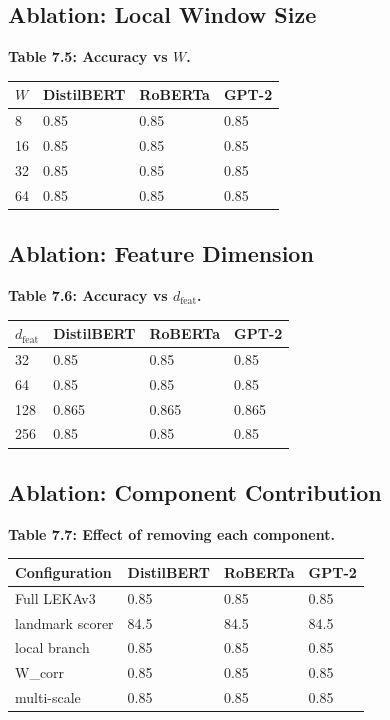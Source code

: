 \subsection{Ablation: Local Window Size}

\textbf{Table 7.5: Accuracy vs $W$.}

\begin{table}[H]
\centering
\small
\begin{tabular}{llll}
\toprule
\textbf{$W$} & \textbf{DistilBERT} & \textbf{RoBERTa} & \textbf{GPT-2} \\
\midrule
8 & 0.85 & 0.85 & 0.85 \\
16 & 0.85 & 0.85 & 0.85 \\
32 & 0.85 & 0.85 & 0.85 \\
64 & 0.85 & 0.85 & 0.85 \\
\bottomrule
\end{tabular}
\end{table}

\subsection{Ablation: Feature Dimension}

\textbf{Table 7.6: Accuracy vs $d_\text{feat}$.}

\begin{table}[H]
\centering
\small
\begin{tabular}{llll}
\toprule
\textbf{$d_\text{feat}$} & \textbf{DistilBERT} & \textbf{RoBERTa} & \textbf{GPT-2} \\
\midrule
32 & 0.85 & 0.85 & 0.85 \\
64 & 0.85 & 0.85 & 0.85 \\
128 & 0.865 & 0.865 & 0.865 \\
256 & 0.85 & 0.85 & 0.85 \\
\bottomrule
\end{tabular}
\end{table}

\subsection{Ablation: Component Contribution}

\textbf{Table 7.7: Effect of removing each component.}

\begin{table}[H]
\centering
\small
\begin{tabular}{llll}
\toprule
\textbf{Configuration} & \textbf{DistilBERT} & \textbf{RoBERTa} & \textbf{GPT-2} \\
\midrule
Full LEKAv3 & 0.85 & 0.85 & 0.85 \\
landmark scorer & 84.5 & 84.5 & 84.5 \\
local branch & 0.85 & 0.85 & 0.85 \\
W\_corr & 0.85 & 0.85 & 0.85 \\
multi-scale & 0.85 & 0.85 & 0.85 \\
\bottomrule
\end{tabular}
\end{table}

